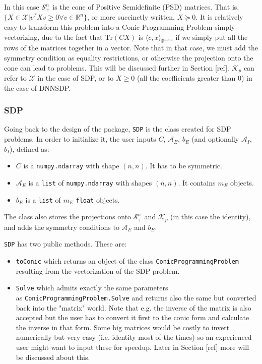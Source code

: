 \documentclass[paper=a4, fontsize=11pt]{scrartcl}
\numberwithin{equation}{section}		%
\numberwithin{figure}{section}			%
\numberwithin{table}{section}				%
\begin{document}
In this case $\mathcal{S}^n_+$ is the cone of Positive Semidefinite (PSD) matrices. That is, $\{X\in\mathcal{X} | v^T X v \geq 0 \forall v \in \mathbb{R}^n\}$, or more succinctly written, $X\succeq 0$. It is relatively easy to transform this problem into a Conic Programming Problem simply vectorizing, due to the fact that $\text{Tr}(CX)$ is $\langle c, x \rangle _{\mathbb{R}^{n\times n}}$ if we simply put all the rows of the matrices together in a vector. Note that in that case, we must add the symmetry condition as equality restrictions, or otherwise the projection onto the cone can lead to problems. This will be discussed further in Section [ref]. $\mathcal{K}_p$ can refer to $\mathcal{X}$ in the case of SDP, or to $X\geq 0$ (all the coefficients greater than $0$) in the case of DNNSDP. 
\subsubsection{SDP}
Going back to the design of the package, \texttt{SDP} is the class created for SDP problems. In order to initialize it, the user inputs $C$, $\mathcal{A}_E$, $b_E$ (and optionally $\mathcal{A}_I$, $b_I$), defined as:
\begin{itemize}
\item $C$ is a \texttt{numpy.ndarray} with shape $(n,n)$. It has to be symmetric.
\item $\mathcal{A}_E$ is a \texttt{list} of \texttt{numpy.ndarray} with shapes $(n,n)$. It contains $m_E$ objects.
\item $b_E$ is a \texttt{list} of $m_E$ \texttt{float} objects.
\end{itemize}

The class also stores the projections onto $\mathcal{S}^n_+$ and $\mathcal{K}_p$ (in this case the identity), and adds the symmetry conditions to $\mathcal{A}_E$ and $b_E$.

\texttt{SDP} has two public methods. These are:
\begin{itemize}
\item \texttt{toConic} which returns an object of the class \texttt{ConicProgrammingProblem} resulting from the vectorization of the SDP problem.
\item \texttt{Solve} which admits exactly the same parameters\\ as \texttt{ConicProgrammingProblem.Solve} and returns also the same but converted back into the "matrix" world. Note that e.g. the inverse of the matrix is also accepted but the user has to convert it first to the conic form and calculate the inverse in that form. Some big matrices would be costly to invert numerically but very easy (i.e. identity most of the times) so an experienced user might want to input these for speedup. Later in Section [ref] more will be discussed about this.
\end{itemize}
\end{document}
